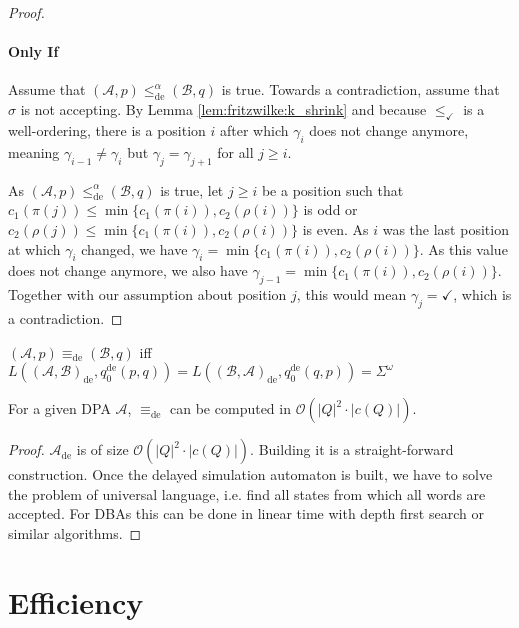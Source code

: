 \begin{proof}
	\paragraph{Only If} Assume that $(\mathcal{A}, p) \leq_\text{de}^\alpha (\mathcal{B}, q)$ is true. Towards a contradiction, assume that $\sigma$ is not accepting. By Lemma \ref{lem:fritzwilke:k_shrink} and because $\leq_\checkmark$ is a well-ordering, there is a position $i$ after which $\gamma_i$ does not change anymore, meaning $\gamma_{i-1} \neq \gamma_i$ but $\gamma_j = \gamma_{j+1}$ for all $j \geq i$.
	
	As $(\mathcal{A}, p) \leq_\text{de}^\alpha (\mathcal{B}, q)$ is true, let $j \geq i$ be a position such that $c_1(\pi(j)) \leq \min \{c_1(\pi(i)), c_2(\rho(i))\}$ is odd or $c_2(\rho(j)) \leq \min \{c_1(\pi(i)), c_2(\rho(i))\}$ is even. As $i$ was the last position at which $\gamma_i$ changed, we have $\gamma_i = \min \{c_1(\pi(i)), c_2(\rho(i))\}$. As this value does not change anymore, we also have $\gamma_{j-1} = \min \{c_1(\pi(i)), c_2(\rho(i))\}$. Together with our assumption about position $j$, this would mean $\gamma_j = \checkmark$, which is a contradiction.
\end{proof}

\begin{cor}
	$(\mathcal{A}, p) \equiv_\text{de} (\mathcal{B}, q)$ iff $L((\mathcal{A}, \mathcal{B})_\text{de}, q_0^\text{de}(p, q)) = L((\mathcal{B}, \mathcal{A})_\text{de}, q_0^\text{de}(q, p)) = \Sigma^\omega$
\end{cor}

\vspace{10pt}

\begin{theorem}
	For a given DPA $\mathcal{A}$, $\equiv_\text{de}$ can be computed in $\mathcal{O}(|Q|^2 \cdot |c(Q)|)$.
\end{theorem}

\begin{proof}
	$\mathcal{A}_\text{de}$ is of size $\mathcal{O}(|Q|^2 \cdot |c(Q)|)$. Building it is a straight-forward construction. Once the delayed simulation automaton is built, we have to solve the problem of universal language, i.e. find all states from which all words are accepted. For DBAs this can be done in linear time with depth first search or similar algorithms.
\end{proof}



\section{Efficiency}



